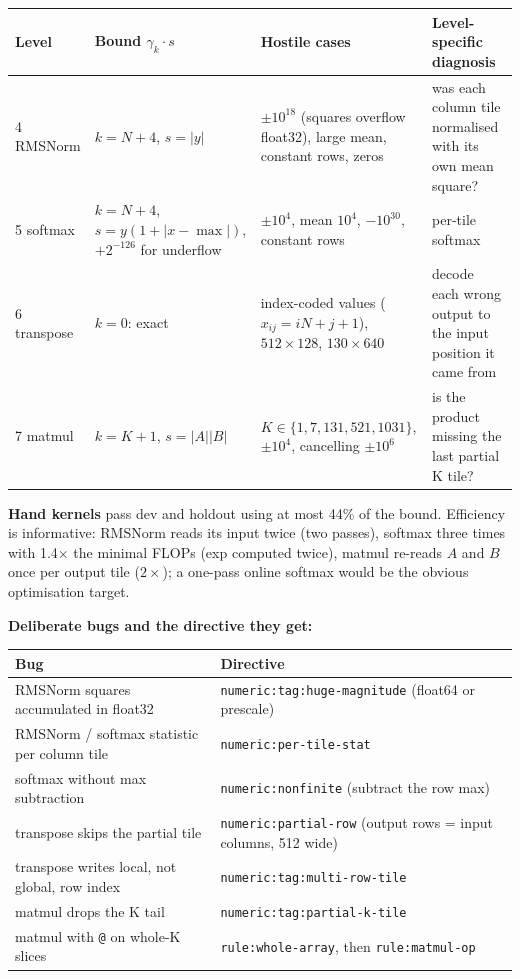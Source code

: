 \documentclass[11pt]{article}
\newcommand{\code}[1]{\texttt{#1}}
\begin{document}
\noindent\begin{tabularx}{\linewidth}{@{}l>{\raggedright\arraybackslash}p{3.6cm}>{\raggedright\arraybackslash}p{3.8cm}Y@{}}
\toprule
Level & Bound $\gamma_k\cdot s$ & Hostile cases & Level-specific diagnosis \\
 RMSNorm & $k=N+4$, $s=|y|$ & $\pm10^{18}$ (squares overflow float32), large mean, constant rows, zeros &
  was each column tile normalised with its own mean square? \\
5 softmax & $k=N+4$, $s = y(1+|x-\max|)$, $+2^{-126}$ for underflow & $\pm10^4$, mean $10^4$,
  $-10^{30}$, constant rows & per-tile softmax \\
6 transpose & $k=0$: exact & index-coded values ($x_{ij}=iN+j+1$), $512\times128$, $130\times640$ &
  decode each wrong output to the input position it came from \\
7 matmul & $k=K+1$, $s=|A||B|$ & $K\in\{1,7,131,521,1031\}$, $\pm10^4$, cancelling $\pm10^6$ &
  is the product missing the last partial K tile? \\
\bottomrule
\end{tabularx}

\medskip
\textbf{Hand kernels} pass dev and holdout using at most 44\% of the bound. Efficiency is
informative: RMSNorm reads its input twice (two passes), softmax three times with 1.4$\times$ the
minimal FLOPs (exp computed twice), matmul re-reads $A$ and $B$ once per output tile ($2\times$);
a one-pass online softmax would be the obvious optimisation target.

\textbf{Deliberate bugs and the directive they get:}

\begin{tabular}{@{}ll@{}}
\toprule
Bug & Directive \\
\midrule
RMSNorm squares accumulated in float32 & \code{numeric:tag:huge-magnitude} (float64 or prescale) \\
RMSNorm / softmax statistic per column tile & \code{numeric:per-tile-stat} \\
softmax without max subtraction & \code{numeric:nonfinite} (subtract the row max) \\
transpose skips the partial tile & \code{numeric:partial-row} (output rows = input columns, 512 wide) \\
transpose writes local, not global, row index & \code{numeric:tag:multi-row-tile} \\
matmul drops the K tail & \code{numeric:tag:partial-k-tile} \\
matmul with \code{@} on whole-K slices & \code{rule:whole-array}, then \code{rule:matmul-op} \\
\bottomrule
\end{tabular}
\end{document}
